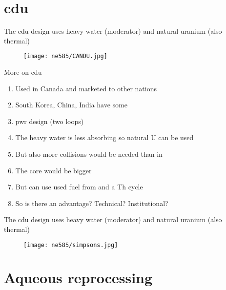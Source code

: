 \documentclass[aspectratio=1610,pdftex,dvipsnames,compress,xcolor={dvipsnames}]{beamer}
\newcommand{\acs}{\acrshort} %
\newcommand{\acsp}{\acrshortpl} %
\begin{document}
\section{\acs{cdu}}


\addtocounter{framenumber}{-1} 
\begin{frame}{The \acs{cdu} design uses heavy water (moderator) and natural uranium (also thermal)}
    \begin{figure}
        \centering
        \texttt{[image: ne585/CANDU.jpg]}
    \end{figure}
\end{frame}


\begin{frame}{More on \acs{cdu}}
    \begin{enumerate}[series=outerlist,topsep=0pt,itemsep=18pt,leftmargin=*,label=(\arabic*)]
        \item[]Used in Canada and marketed to other nations
        \item[]South Korea, China, India have some
        \item[]\acs{pwr} design (two loops)
        \item[]The heavy water is less absorbing so natural U can be used
        \item[]But also more collisions would be needed than in \acsp{lwr}
        \item[]The core would be bigger
        \item[]But can use used fuel from \acsp{lwr} and a Th cycle
        \item[]So is there an advantage?  Technical?  Institutional?
    \end{enumerate}
\end{frame}


\begin{frame}{The \acs{cdu} design uses heavy water (moderator) and natural uranium (also thermal)}
    \begin{figure}
        \centering
        \texttt{[image: ne585/simpsons.jpg]}
    \end{figure}
\end{frame}


\section{Aqueous reprocessing}
\end{document}
